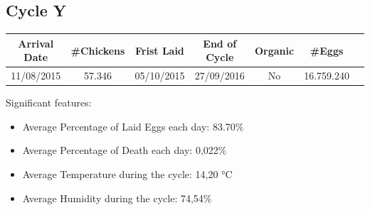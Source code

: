 \documentclass[11pt]{article}
\begin{document}
\subsection{Cycle Y}
\begin{center}
    \begin{tabular}{| c | c | c | c | c | c | c |}
        \hline
        \textbf{Arrival Date} & \textbf{\#Chickens} & \textbf{Frist Laid} & \textbf{End of Cycle} & \textbf{Organic} & \textbf{\#Eggs}     \\ [0.5ex]
        \hline
        11/08/2015   & 57.346     & 05/10/2015 & 27/09/2016   & No      & 16.759.240 \\
        \hline
    \end{tabular}
\end{center}

Significant features:
\begin{itemize}
    \item Average Percentage of Laid Eggs each day: 83.70\%
    \item Average Percentage of Death each day: 0,022\%
    \item Average Temperature during the cycle: 14,20 °C
    \item Average Humidity during the cycle: 74,54\%
\end{itemize}
\end{document}
